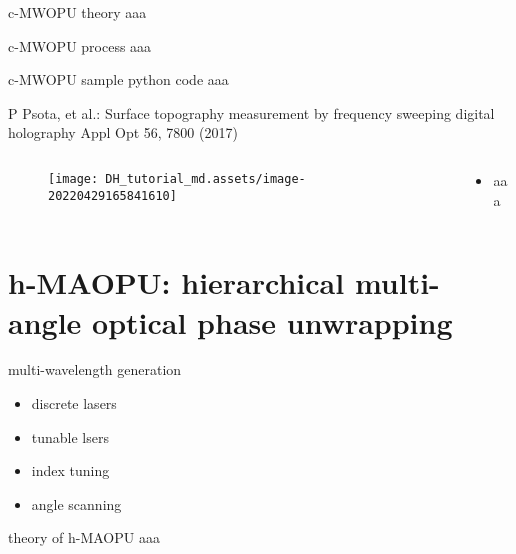 \documentclass[t, aspectratio=169]{beamer}
\begin{document}
\begin{frame}{c-MWOPU theory}
aaa
\end{frame}


\begin{frame}{c-MWOPU process}
aaa
\end{frame}


\begin{frame}{c-MWOPU sample python code}
aaa
\end{frame}


\begin{frame}{P Psota, et al.: Surface topography measurement by frequency sweeping digital holography}
	\vspace{-3 mm}
	\small Appl Opt 56, 7800 (2017)
	\begin{columns}
		\begin{column}{.6\textwidth}
			\begin{figure}
				\texttt{[image: DH\_tutorial\_md.assets/image-20220429165841610]}
			\end{figure}
		\end{column}
		\begin{column}{.4\textwidth}
			\begin{itemize}
				\item aaa
			\end{itemize}
		\end{column}
	\end{columns}
\end{frame}


\section{h-MAOPU: hierarchical multi-angle optical phase unwrapping}
\begin{frame}[c]
	\centering\LARGE\textbf{\secname}
\end{frame}


\begin{frame}{multi-wavelength generation}
	\begin{itemize}
		\item discrete lasers
		\item tunable lsers
		\item index tuning
		\item angle scanning
	\end{itemize}
\end{frame}


\begin{frame}{theory of h-MAOPU}
aaa
\end{frame}
\end{document}
